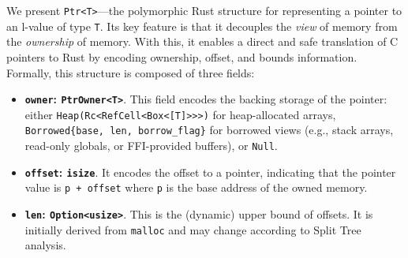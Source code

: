 \documentclass{llncs} %
\begin{document}
We present \texttt{Ptr<T>}---the polymorphic Rust structure for representing a pointer to an l-value of type \texttt{T}. Its key feature is that it decouples the \textit{view} of memory from the \textit{ownership} of memory. With this, it enables a direct and safe translation of C pointers to Rust by encoding ownership, offset, and bounds information. Formally, this structure is composed of three fields:
%
\begin{itemize}
\item \textbf{\texttt{owner}: \texttt{PtrOwner<T>}}. This field encodes the backing storage of the pointer: either \texttt{Heap(Rc<RefCell<Box<[T]{>}{>}{>})} for heap-allocated arrays, \texttt{Borrowed\{\linebreak[0]base, len, borrow\_flag\}} for borrowed views (e.g., stack arrays, read-only globals, or FFI-provided buffers), or \texttt{Null}.

\item \textbf{\texttt{offset}: \texttt{isize}}. It encodes the offset to a pointer, indicating that the pointer value is \texttt{p + offset} where \texttt{p} is the base address of the owned memory.
  
\item \textbf{\texttt{len}: \texttt{Option<usize>}}. This is the (dynamic) upper bound of offsets. It is initially derived from \texttt{malloc} and may change according to Split Tree analysis.

\end{itemize}

\end{document}
